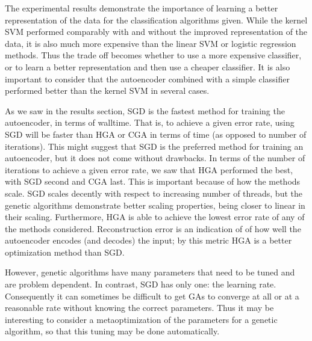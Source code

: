 The experimental results demonstrate the importance of learning a better representation of the data for the classification algorithms given. While the kernel SVM performed comparably with and without the improved representation of the data, it is also much more expensive than the linear SVM or logistic regression methods. Thus the trade off becomes whether to use a more expensive classifier, or to learn a better representation and then use a cheaper classifier. It is also important to consider that the autoencoder combined with a simple classifier performed better than the kernel SVM in several cases.

As we saw in the results section, SGD is the fastest method for training the autoencoder, in terms of walltime. That is, to achieve a given error rate, using SGD will be faster than HGA or CGA in terms of time (as opposed to number of iterations). This might suggest that SGD is the preferred method for training an autoencoder, but it does not come without drawbacks. In terms of the number of iterations to achieve a given error rate, we saw that HGA performed the best, with SGD second and CGA last. This is important because of how the methods scale. SGD scales decently with respect to increasing number of threads, but the genetic algorithms demonstrate better scaling properties, being closer to linear in their scaling. 
Furthermore, HGA is able to achieve the lowest error rate of any of the methods considered. Reconstruction error is an indication of of how well the autoencoder encodes (and decodes) the input; by this metric HGA is a better optimization method than SGD.

However, genetic algorithms have many parameters that need to be tuned and are problem dependent. In contrast, SGD has only one: the learning rate. Consequently it can sometimes be difficult to get GAs to converge at all or at a reasonable rate without knowing the correct parameters. Thus it may be interesting to consider a metaoptimization of the parameters for a genetic algorithm, so that this tuning may be done automatically. 


